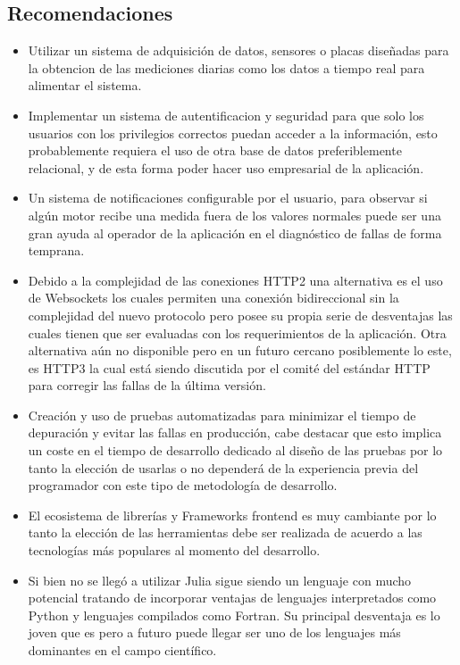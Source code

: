 \subsection{Recomendaciones}
\begin{itemize}
    \item Utilizar un sistema de adquisición de datos, sensores o placas diseñadas
        para la obtencion de las mediciones diarias como los datos a tiempo
        real para alimentar el sistema.

    \item  Implementar un sistema de autentificacion y seguridad para que solo
        los usuarios con los
        privilegios correctos puedan acceder a la información, esto
        probablemente requiera el uso de otra base de datos preferiblemente
        relacional, y de esta forma poder hacer uso empresarial
        de la aplicación.

    \item Un sistema de notificaciones configurable por el usuario, para
        observar si algún motor recibe una medida fuera de los valores normales
        puede ser una gran ayuda al operador de la aplicación en el diagnóstico
        de fallas de forma temprana.

    \item Debido a la complejidad de las conexiones HTTP2 una alternativa es el
        uso de Websockets los cuales permiten una conexión bidireccional sin la
        complejidad del nuevo protocolo pero posee su propia serie de
        desventajas las cuales tienen que ser evaluadas con los requerimientos
        de la aplicación. Otra alternativa aún no disponible pero en un futuro
        cercano posiblemente lo este, es HTTP3 la cual está siendo discutida
        por el comité del estándar HTTP para corregir las fallas de la última
        versión.

    \item Creación y uso de  pruebas automatizadas para minimizar el tiempo de
        depuración y evitar las fallas en producción, cabe destacar que esto
        implica un coste
        en el tiempo de desarrollo dedicado al diseño de las pruebas por lo
        tanto la elección de usarlas o no dependerá de la experiencia previa
        del programador con este tipo de metodología de desarrollo.

    \item El ecosistema de librerías y Frameworks frontend es muy cambiante por
        lo tanto la elección de las herramientas debe ser realizada de acuerdo
        a las tecnologías más populares al momento del desarrollo.

    \item  Si bien no se llegó a utilizar Julia sigue siendo un lenguaje con
        mucho potencial tratando de incorporar ventajas de lenguajes
        interpretados como Python y lenguajes compilados como Fortran. Su
        principal desventaja es lo joven que es pero a futuro puede llegar ser
        uno de los lenguajes más dominantes en el campo científico.

\end{itemize}
